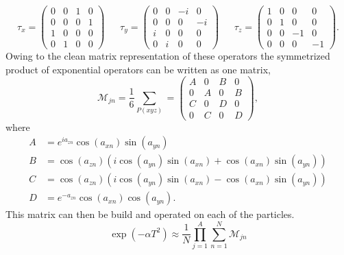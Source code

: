 \documentclass[12pt]{article}
\begin{document}
\begin{equation}
\tau_x=
\begin{pmatrix}
    0 & 0 & 1 & 0 \\
    0 & 0 & 0 & 1 \\
    1 & 0 & 0 & 0 \\
    0 & 1 & 0 & 0
\end{pmatrix}
~~~~~~~\tau_y=
\begin{pmatrix}
    0 & 0 & -i & 0 \\
    0 & 0 & 0 & -i \\
    i & 0 & 0 & 0 \\
    0 & i & 0 & 0
\end{pmatrix}
~~~~~~~\tau_z=
\begin{pmatrix}
    1 & 0 & 0 & 0 \\
    0 & 1 & 0 & 0 \\
    0 & 0 & -1 & 0 \\
    0 & 0 & 0 & -1
\end{pmatrix}.
\end{equation}
Owing to the clean matrix representation of these operators the symmetrized product of exponential operators can be written as one matrix,
\begin{equation}
   \mathcal{M}_{jn} = \frac{1}{6} \sum\limits_{P(xyz)} =
\begin{pmatrix}
   A & 0 & B & 0 \\
   0 & A & 0 & B \\
   C & 0 & D & 0 \\
   0 & C & 0 & D
\end{pmatrix},
\end{equation}
where
\begin{align}
   A &= e^{ia_{zn}}\cos(a_{xn})\sin(a_{yn}) \\
   B &= \cos(a_{zn})\left(i\cos(a_{yn})\sin(a_{xn})+\cos(a_{xn})\sin(a_{yn})\right) \\
   C &= \cos(a_{zn})\left(i\cos(a_{yn})\sin(a_{xn})-\cos(a_{xn})\sin(a_{yn})\right) \\
   D &= e^{-a_{zn}}\cos(a_{xn})\cos(a_{yn}).
\end{align}
This matrix can then be build and operated on each of the particles.
\begin{equation} 
   \exp{\left(-\alpha T^2\right)} \approx \frac{1}{N} \prod\limits_{j=1}^A \sum\limits_{n=1}^N \mathcal{M}_{jn}
\end{equation}
\end{document}
